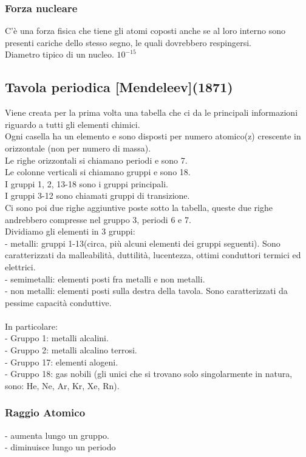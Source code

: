 \subsubsection{Forza nucleare}
C'è una forza fisica che tiene gli atomi coposti anche se al loro interno sono presenti cariche dello stesso segno, le quali dovrebbero respingersi. \\
Diametro tipico di un nucleo. $10^{-15}$
\subsection{Tavola periodica [Mendeleev](1871)}
Viene creata per la prima volta una tabella che ci da le principali informazioni riguardo a tutti gli elementi chimici.\\
Ogni casella ha un elemento e sono disposti per numero atomico(z) crescente in orizzontale (non per numero di massa).\\
Le righe orizzontali si chiamano periodi e sono 7.\\
Le colonne verticali si chiamano gruppi e sono 18.\\
I gruppi 1, 2, 13-18 sono i gruppi principali.\\
I gruppi 3-12 sono chiamati gruppi di transizione.\\
Ci sono poi due righe aggiuntive poste sotto la tabella, queste due righe andrebbero compresse nel gruppo 3, periodi 6 e 7.\\
Dividiamo gli elementi in 3 gruppi:\\
- metalli: gruppi 1-13(circa, più alcuni elementi dei gruppi seguenti). Sono caratterizzati da malleabilità, duttilità, lucentezza, ottimi conduttori termici ed elettrici.\\
- semimetalli: elementi posti fra metalli e non metalli.\\
- non metalli: elementi posti sulla destra della tavola. Sono caratterizzati da pessime capacità conduttive.\\\\
In particolare:\\
- Gruppo 1: metalli alcalini.\\
- Gruppo 2: metalli alcalino terrosi.\\
- Gruppo 17: elementi alogeni. \\
- Gruppo 18: gas nobili (gli unici che si trovano solo singolarmente in natura, sono: He, Ne, Ar, Kr, Xe, Rn).
\subsubsection{Raggio Atomico}
- aumenta lungo un gruppo.\\
- diminuisce lungo un periodo
